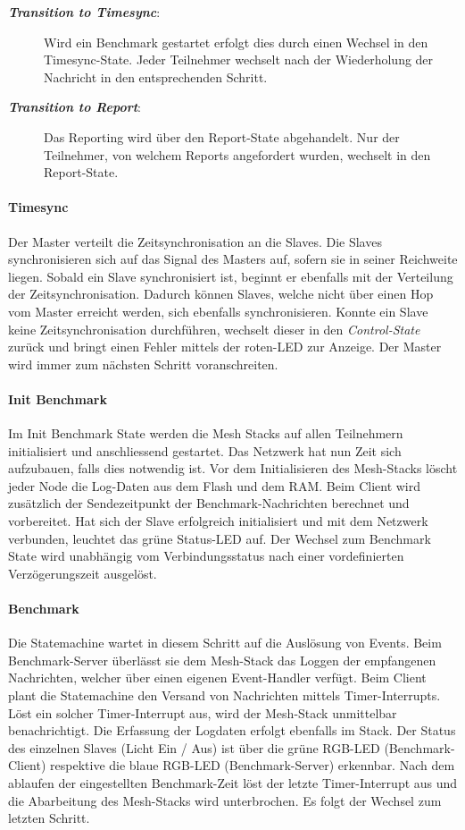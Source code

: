\begin{description}
	\item[\textit{\textbf{Transition to Timesync}}:]
	Wird ein Benchmark gestartet erfolgt dies durch einen Wechsel in den Timesync-State. Jeder Teilnehmer wechselt nach der Wiederholung der Nachricht in den entsprechenden Schritt. 
	\item[\textit{\textbf{Transition to Report}}:]
	Das Reporting wird über den Report-State abgehandelt. Nur der Teilnehmer, von welchem Reports angefordert wurden, wechselt in den Report-State. 
\end{description} 	
	
\paragraph{Timesync}
Der Master verteilt die Zeitsynchronisation an die Slaves. Die Slaves synchronisieren sich auf das Signal des Masters auf, sofern sie in seiner Reichweite liegen. Sobald ein Slave synchronisiert ist, beginnt er ebenfalls mit der Verteilung der Zeitsynchronisation.
Dadurch können Slaves, welche nicht über einen Hop vom Master erreicht werden, sich ebenfalls synchronisieren.
Konnte ein Slave keine Zeitsynchronisation durchführen, wechselt dieser in den  \textit{Control-State} zurück und bringt einen Fehler mittels der roten-LED zur Anzeige. Der Master wird immer zum nächsten Schritt voranschreiten. 	

\paragraph{Init Benchmark}
Im Init Benchmark State werden die Mesh Stacks auf allen Teilnehmern initialisiert und anschliessend gestartet.
Das Netzwerk hat nun Zeit sich aufzubauen, falls dies notwendig ist.
Vor dem Initialisieren des Mesh-Stacks löscht jeder Node die Log-Daten aus dem Flash und dem RAM.
Beim Client wird zusätzlich der Sendezeitpunkt der Benchmark-Nachrichten berechnet und vorbereitet.
Hat sich der Slave erfolgreich initialisiert und mit dem Netzwerk verbunden, leuchtet das grüne Status-LED auf.
Der Wechsel zum Benchmark State wird unabhängig vom Verbindungsstatus nach einer vordefinierten Verzögerungszeit ausgelöst.

\paragraph{Benchmark}
Die Statemachine wartet in diesem Schritt auf die Auslösung von Events.
Beim Benchmark-Server überlässt sie dem Mesh-Stack das Loggen der empfangenen Nachrichten, welcher über einen eigenen Event-Handler verfügt.
Beim Client plant die Statemachine den Versand von Nachrichten mittels Timer-Interrupts.
Löst ein solcher Timer-Interrupt aus, wird der Mesh-Stack unmittelbar benachrichtigt.
Die Erfassung der Logdaten erfolgt ebenfalls im Stack.
Der Status des einzelnen Slaves (Licht Ein / Aus) ist über die grüne RGB-LED (Benchmark-Client) respektive die blaue RGB-LED (Benchmark-Server) erkennbar.
Nach dem ablaufen der eingestellten Benchmark-Zeit löst der letzte Timer-Interrupt aus und die Abarbeitung des Mesh-Stacks wird unterbrochen.
Es folgt der Wechsel zum letzten Schritt.


